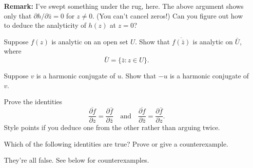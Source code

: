 \documentclass[12pt, answers]{exam}
\DeclareMathOperator{\length}{length}
\begin{document}
\begin{questions}
\begin{solution}
        \textbf{Remark:} I've swept something under the rug, here. The above argument shows only that $\partial h/\partial \bar z=0$ for $z\neq 0$. (You can't cancel zeros!)
        Can you figure out how to deduce the analyticity of $h(z)$ at $z=0$?
    \end{solution}

    \question
    Suppose $f(z)$ is analytic on an open set $U$. Show that $\overline{f(\bar z)}$ is analytic on $\bar U$,
    where
    \[
        \bar U = \{\bar z: z\in U\}.
    \]

    \question
    Suppose $v$ is a harmonic conjugate of $u$. Show that $-u$ is a harmonic conjugate of $v$.

\question
Prove the identities $$\overline{\dfrac{\partial f}{\partial z}} = \dfrac{\partial \bar f}{\partial \bar z}\quad\text{and}\quad
\overline{\dfrac{\partial f}{\partial \bar z}} = \dfrac{\partial \bar f}{\partial z}.$$ Style points if you deduce one from the other rather than arguing twice.

\question Which of the following identities are true? Prove or give a counterexample.
\begin{solution}
    They're all false.  See below for counterexamples.
\end{solution}
\end{questions}
\end{document}
